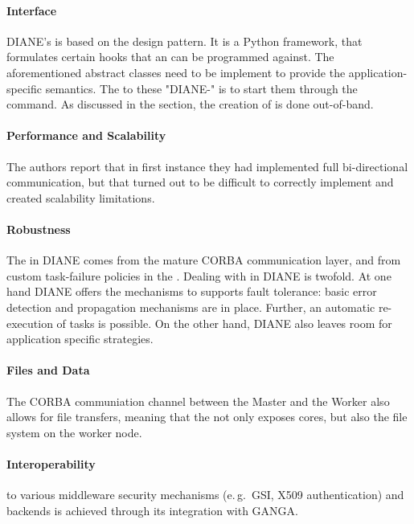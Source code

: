 \documentclass{sig-alternate}
\begin{document}
\paragraph{Interface}
DIANE's  is based on the 
design pattern.
It is a Python framework, that formulates certain hooks that an
 can be programmed against. The aforementioned abstract
classes need to be implement to provide the application-specific semantics.
The  to these "DIANE-" is to start them
through the  command.
As discussed in the  section, the creation of \pilots
is done out-of-band.

\paragraph{Performance and Scalability}
The authors report that in first instance they had implemented full
bi-directional communication, but that turned out to be difficult to correctly
implement and created scalability limitations.

\paragraph{Robustness}
The  in DIANE comes from the mature CORBA communication
layer, and from custom task-failure policies in the .
Dealing with  in DIANE is twofold.
At one hand DIANE offers the mechanisms to supports fault tolerance: basic
error detection and propagation mechanisms are in place.
Further, an automatic re-execution of tasks is possible.
On the other hand, DIANE also leaves room for application specific strategies.

\paragraph{Files and Data}
The CORBA communiation channel between the Master and the Worker also allows
for file transfers, meaning that the \pilot not only exposes cores, but also
the file system on the worker node.

\paragraph{Interoperability}
 to various middleware security mechanisms
(e.\,g.\ GSI, X509 authentication) and backends is achieved through its
integration with GANGA.
\end{document}
